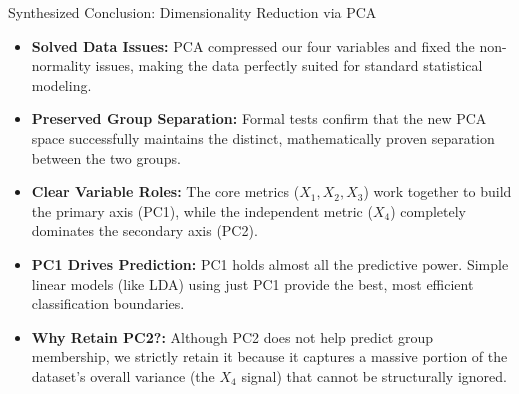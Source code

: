 \documentclass[8pt, aspectratio=169]{beamer}
\begin{document}
\begin{frame}{Synthesized Conclusion: Dimensionality Reduction via PCA}
    \begin{itemize}
        \item \textbf{Solved Data Issues:} PCA compressed our four variables and fixed the non-normality issues, making the data perfectly suited for standard statistical modeling.
        
        \vspace{0.2cm}
        \item \textbf{Preserved Group Separation:} Formal tests confirm that the new PCA space successfully maintains the distinct, mathematically proven separation between the two groups.
        
        \vspace{0.2cm}
        \item \textbf{Clear Variable Roles:} The core metrics ($X_1, X_2, X_3$) work together to build the primary axis (PC1), while the independent metric ($X_4$) completely dominates the secondary axis (PC2).
        
        \vspace{0.2cm}
        \item \textbf{PC1 Drives Prediction:} PC1 holds almost all the predictive power. Simple linear models (like LDA) using just PC1 provide the best, most efficient classification boundaries.
        
        \vspace{0.2cm}
        \item \textbf{Why Retain PC2?:} Although PC2 does not help predict group membership, we strictly retain it because it captures a massive portion of the dataset's overall variance (the $X_4$ signal) that cannot be structurally ignored.
    \end{itemize}
\end{frame}
\end{document}
